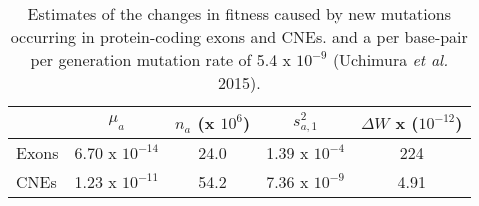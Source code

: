 


\begin{table}
\centering

\caption{Estimates of the changes in fitness caused by new mutations occurring in protein-coding exons and CNEs.  and a per base-pair per generation mutation rate of 5.4 x $10^{-9}$ (Uchimura \textit{et al.} 2015).}
 \begin{tabular}{l c c c c} 

  \hline
		& $\mu_a$  & $n_a$ (x $10^6$)& $s_{a,1}^2$ & $\Delta W$ x ($10^{-12}$) \\ [0.5ex] \hline
	Exons & 6.70 x $10^{-14}$ & 24.0 & 1.39 x $10^{-4}$ & 224 \\
	CNEs  & 1.23 x $10^{-11}$ & 54.2 & 7.36 x $10^{-9}$ & 4.91 \\ \hline
\end{tabular}    
    \label{tab:fitnessTable}

\end{table}
